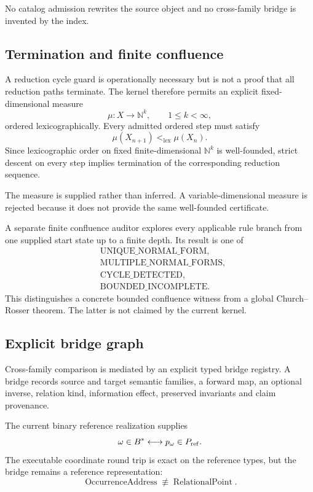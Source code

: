 \documentclass[11pt]{article}
\begin{document}
No catalog admission rewrites the source object and no cross-family bridge is
invented by the index.

\subsection{Termination and finite confluence}

A reduction cycle guard is operationally necessary but is not a proof that all
reduction paths terminate. The kernel therefore permits an explicit
fixed-dimensional measure
\[
\mu:X\to\mathbb N^k,
\qquad
1\le k<\infty,
\]
ordered lexicographically. Every admitted ordered step must satisfy
\[
\boxed{
\mu(X_{n+1})<_{\mathrm{lex}}\mu(X_n).
}
\]
Since lexicographic order on fixed finite-dimensional \(\mathbb N^k\) is
well-founded, strict descent on every step implies termination of the
corresponding reduction sequence.

The measure is supplied rather than inferred. A variable-dimensional measure
is rejected because it does not provide the same well-founded certificate.

A separate finite confluence auditor explores every applicable rule branch from
one supplied start state up to a finite depth. Its result is one of
\[
\begin{aligned}
&\mathrm{UNIQUE\_NORMAL\_FORM},\\
&\mathrm{MULTIPLE\_NORMAL\_FORMS},\\
&\mathrm{CYCLE\_DETECTED},\\
&\mathrm{BOUNDED\_INCOMPLETE}.
\end{aligned}
\]
This distinguishes a concrete bounded confluence witness from a global
Church--Rosser theorem. The latter is not claimed by the current kernel.

\subsection{Explicit bridge graph}

Cross-family comparison is mediated by an explicit typed bridge registry.
A bridge records source and target semantic families, a forward map, an
optional inverse, relation kind, information effect, preserved invariants and
claim provenance.

The current binary reference realization supplies
\[
\omega\in B^*
\longleftrightarrow
p_\omega\in P_{\rm ref}.
\]
The executable coordinate round trip is exact on the reference types, but the
bridge remains a reference representation:
\[
\boxed{
\operatorname{OccurrenceAddress}
\not\equiv
\operatorname{RelationalPoint}.
}
\]
\end{document}
